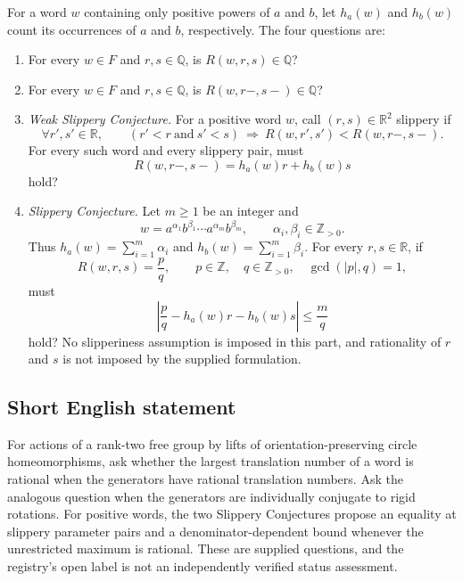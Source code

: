 \documentclass[11pt]{article}
\newcommand{\Z}{\mathbb{Z}}
\newcommand{\Q}{\mathbb{Q}}
\newcommand{\R}{\mathbb{R}}
\begin{document}
For a word \(w\) containing only positive powers of \(a\) and \(b\), let \(h_a(w)\) and \(h_b(w)\) count its occurrences of \(a\) and \(b\), respectively. The four questions are:
\begin{enumerate}
\item[(a)] For every \(w\in F\) and \(r,s\in\Q\), is \(R(w,r,s)\in\Q\)?
\item[(b)] For every \(w\in F\) and \(r,s\in\Q\), is \(R(w,r-,s-)\in\Q\)?
\item[(c)] \emph{Weak Slippery Conjecture.} For a positive word \(w\), call \((r,s)\in\R^2\) slippery if
\[
\forall r',s'\in\R,\qquad
(r'<r\ \text{and}\ s'<s)\ \Longrightarrow\ R(w,r',s')<R(w,r-,s-).
\]
For every such word and every slippery pair, must
\[
R(w,r-,s-)=h_a(w)r+h_b(w)s
\]
hold?
\item[(d)] \emph{Slippery Conjecture.} Let \(m\geq1\) be an integer and
\[
w=a^{\alpha_1}b^{\beta_1}\cdots a^{\alpha_m}b^{\beta_m},
\qquad \alpha_i,\beta_i\in\Z_{>0}.
\]
Thus \(h_a(w)=\sum_{i=1}^{m}\alpha_i\) and \(h_b(w)=\sum_{i=1}^{m}\beta_i\). For every \(r,s\in\R\), if
\[
R(w,r,s)=\frac pq,\qquad p\in\Z,\quad q\in\Z_{>0},\quad \gcd(|p|,q)=1,
\]
must
\[
\left|\frac pq-h_a(w)r-h_b(w)s\right|\leq\frac mq
\]
hold? No slipperiness assumption is imposed in this part, and rationality of \(r\) and \(s\) is not imposed by the supplied formulation.
\end{enumerate}
\subsection{Short English statement}
For actions of a rank-two free group by lifts of orientation-preserving circle homeomorphisms, ask whether the largest translation number of a word is rational when the generators have rational translation numbers. Ask the analogous question when the generators are individually conjugate to rigid rotations. For positive words, the two Slippery Conjectures propose an equality at slippery parameter pairs and a denominator-dependent bound whenever the unrestricted maximum is rational. These are supplied questions, and the registry's open label is not an independently verified status assessment.
\end{document}
